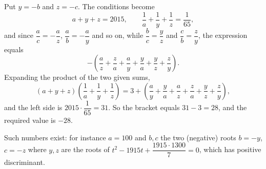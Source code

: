 Put $y=-b$ and $z=-c$. The conditions become
\[
a+y+z=2015,\qquad\dfrac{1}{a}+\dfrac{1}{y}+\dfrac{1}{z}=\dfrac{1}{65},
\]
and since $\dfrac {a}{c}=-\dfrac {a}{z}$, $\dfrac {a}{b}=-\dfrac {a}{y}$ and so on, while $\dfrac {b}{c}=\dfrac {y}{z}$ and $\dfrac {c}{b}=\dfrac {z}{y}$, the expression equals
\[
-\left(\dfrac {a}{z}+\dfrac {z}{a}+\dfrac {a}{y}+\dfrac {y}{a}+\dfrac {y}{z}+\dfrac {z}{y}\right).
\]
Expanding the product of the two given sums,
\[
(a+y+z)\left(\dfrac{1}{a}+\dfrac{1}{y}+\dfrac{1}{z}\right)=3+\left(\dfrac {a}{y}+\dfrac {y}{a}+\dfrac {a}{z}+\dfrac {z}{a}+\dfrac {y}{z}+\dfrac {z}{y}\right),
\]
and the left side is $2015\cdot\dfrac{1}{65}=31$. So the bracket equals $31-3=28$, and the required value is $\boxed{-28}$.

Such numbers exist: for instance $a=100$ and $b,c$ the two (negative) roots $b=-y$, $c=-z$ where $y,z$ are the roots of $t^2-1915t+\dfrac{1915\cdot1300}{7}=0$, which has positive discriminant.
